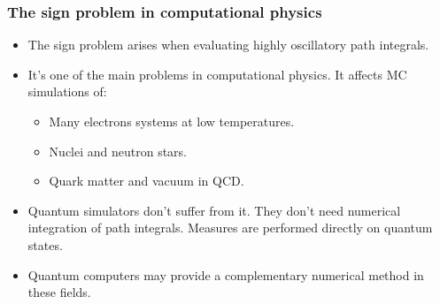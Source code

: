 \documentclass[11pt,t,xcolor=dvipsnames,aspectratio=169]{beamer}
\begin{document}
\begin{frame}
    \frametitle{The sign problem in computational physics}
    \begin{itemize}
        \item
            The sign problem arises when evaluating highly oscillatory path integrals.
        \item
            It's one of the main problems in computational physics.
            It affects MC simulations of:
            \begin{itemize}
                \item Many electrons systems at low temperatures.
                \item Nuclei and neutron stars.
                \item Quark matter and vacuum in QCD.
            \end{itemize}
        \item
            Quantum simulators don't suffer from it.
            They don't need numerical integration of path integrals.
            Measures are performed directly on quantum states.
        \item
            Quantum computers may provide a complementary numerical method in these fields.
    \end{itemize}
\end{frame}
\end{document}

